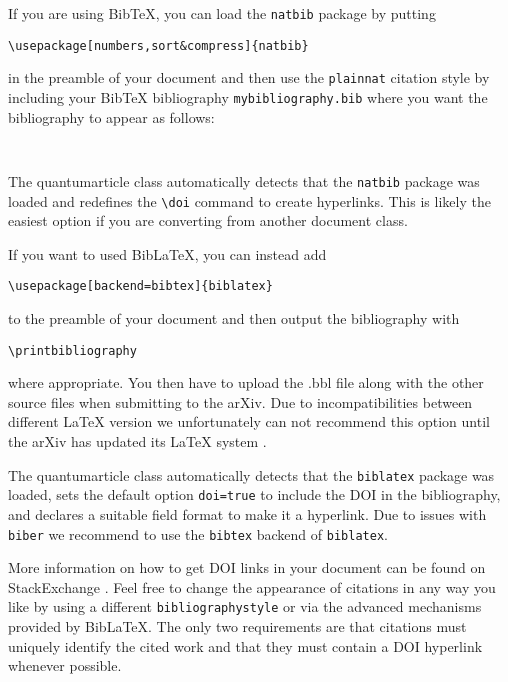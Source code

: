 \documentclass[a4paper,twocolumn,superscriptaddress,11pt,accepted=2017-05-09]{quantumarticle}
\begin{document}
If you are using BibTeX, you can load the \texttt{natbib} package by putting
\begin{verbatim}
\usepackage[numbers,sort&compress]{natbib}
\end{verbatim}
in the preamble of your document and then use the \texttt{plainnat} citation style by including your BibTeX bibliography \texttt{mybibliography.bib} where you want the bibliography to appear as follows:
\begin{verbatim}


\end{verbatim}
The quantumarticle class automatically detects that the \texttt{natbib} package was loaded and redefines the \texttt{\textbackslash{}doi} command to create hyperlinks.
This is likely the easiest option if you are converting from another document class.

If you want to used BibLaTeX, you can instead add
\begin{verbatim}
\usepackage[backend=bibtex]{biblatex}

\end{verbatim}
to the preamble of your document and then output the bibliography with
\begin{verbatim}
\printbibliography
\end{verbatim}
where appropriate.
You then have to upload the .bbl file along with the other source files when submitting to the arXiv.
Due to incompatibilities between different LaTeX version we unfortunately can not recommend this option until the arXiv has updated its LaTeX system \cite{biblatexsubmittingtothearxiv}.

The quantumarticle class automatically detects that the \texttt{biblatex} package was loaded, sets the default option \texttt{doi=true} to include the DOI in the bibliography, and declares a suitable field format to make it a hyperlink.
Due to issues with \texttt{biber} we recommend to use the \texttt{bibtex} backend of \texttt{biblatex}.

More information on how to get DOI links in your document can be found on StackExchange \cite{howtogetdoilinksinbibliography,automaticallyaddingdoifieldstoahandmadebibliography}.
Feel free to change the appearance of citations in any way you like by using a different \texttt{bibliographystyle} or via the advanced mechanisms provided by BibLaTeX.
The only two requirements are that citations must uniquely identify the cited work and that they must contain a DOI hyperlink whenever possible.
\end{document}
